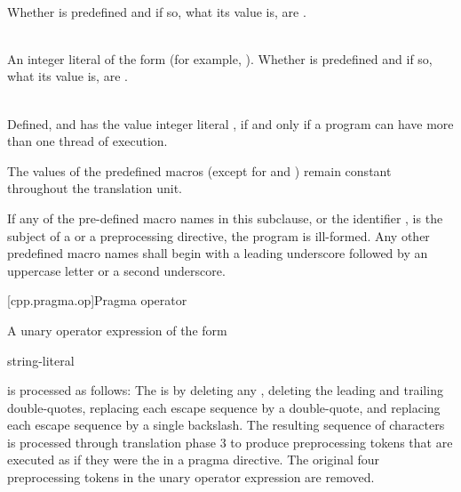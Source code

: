 \begin{description}
\item
{}%
\\
Whether  is predefined and if so, what its value is,
are .

\item
{}%
\\
An integer literal of the form 
(for example, ).
Whether  is predefined and
if so, what its value is,
are .

\item
{}%
\\
Defined, and has the value integer literal , if and only if a program
can have more than one thread of execution.

\end{description}

\pnum
The values of the predefined macros
(except for
and
)
remain constant throughout the translation unit.

\pnum
If any of the pre-defined macro names in this subclause,
or the identifier
,
is the subject of a
or a
preprocessing directive,
the program is ill-formed.
Any other predefined macro names shall begin with a
leading underscore followed by an uppercase letter or a second
underscore.

[cpp.pragma.op]{Pragma operator}%
%

\pnum
A unary operator expression of the form
\begin{ncbnf}
 \terminal{(} string-literal \terminal{)}
\end{ncbnf}
is processed as follows: The  is 
by deleting any , deleting the leading and trailing
double-quotes, replacing each escape sequence  by a double-quote, and
replacing each escape sequence \tcode{\textbackslash\textbackslash} by a single
backslash. The resulting sequence of characters is processed through translation phase 3
to produce preprocessing tokens that are executed as if they were the
 in a pragma directive. The original four preprocessing
tokens in the unary operator expression are removed.

